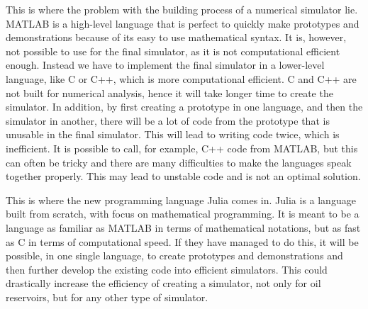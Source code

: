 This is where the problem with the building process of a numerical simulator lie. MATLAB is a high-level language that is perfect to quickly make prototypes and demonstrations because of its easy to use mathematical syntax. It is, however, not possible to use for the final simulator, as it is not computational efficient enough. Instead we have to implement the final simulator in a lower-level language, like C or C++, which is more computational efficient. C and C++ are not built for numerical analysis, hence it will take longer time to create the simulator. In addition, by first creating a prototype in one language, and then the simulator in another, there will be a lot of code from the prototype that is unusable in the final simulator. This will lead to writing code twice, which is inefficient. It is possible to call, for example, C++ code from MATLAB, but this can often be tricky and there are many difficulties to make the languages speak together properly. This may lead to unstable code and is not an optimal solution. 

This is where the new programming language Julia comes in. Julia is a language built from scratch, with focus on mathematical programming. It is meant to be a language as familiar as MATLAB in terms of mathematical notations, but as fast as C in terms of computational speed. If they have managed to do this, it will be possible, in one single language, to create prototypes and demonstrations and then further develop the existing code into efficient simulators. This could drastically increase the efficiency of creating a simulator, not only for oil reservoirs, but for any other type of simulator. 

